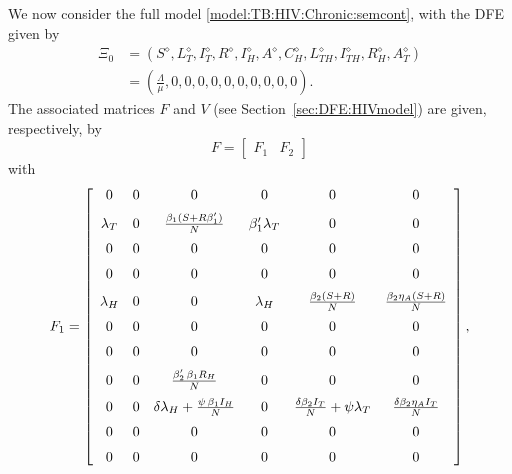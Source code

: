\documentclass{my_aims}
\theoremstyle{definition}
\begin{document}
We now consider the full model \eqref{model:TB:HIV:Chronic:semcont},
with the DFE given by
\begin{equation*}
\begin{split}
\Xi_0 &= \left( S^\diamond, L_T^\diamond, I_T^\diamond, R^\diamond, I_H^\diamond, A^\diamond,
C_H^\diamond, L_{TH}^\diamond, I_{TH}^\diamond, R_H^\diamond, A_T^\diamond \right)\\
&= \left( \frac{\Lambda}{\mu}, 0, 0, 0, 0, 0, 0, 0, 0, 0, 0 \right).
\end{split}
\end{equation*}
The associated matrices $F$ and $V$ (see Section~\ref{sec:DFE:HIVmodel})
are given, respectively, by
\begin{equation*}
F = \left[ \begin {array}{cc}
F_1 & F_2
\end {array} \right]
\end{equation*}
with
\begin{equation*}
F_1 = \left[ \begin {array}{cccccc}
0&0&0&0&0&0\\ \noalign{\medskip}
\lambda_T &0&{\frac{\beta_1(S + R \beta'_1)}{N}} & \beta'_1 \lambda_T &0&0\\
\noalign{\medskip} 0&0&0&0&0&0\\
\noalign{\medskip}0&0&0&0&0&0\\ \noalign{\medskip}
\lambda_H &0&0&\lambda_H&{\frac{\beta_2(S + R)}{N}}
&{\frac{\beta_2 \eta_A(S + R)}{N}} \\
\noalign{\medskip} 0&0&0&0&0&0\\
\noalign{\medskip} 0&0&0&0&0&0\\
\noalign{\medskip} 0&0&{\frac {\beta'_2 \,\beta_1 R_H}{N}} &0&0&0\\
\noalign{\medskip} 0&0&\delta \lambda_H
+{\frac{\psi\,\beta_1 I_H}{N}}&0&
{\frac{\delta \beta_2 I_T}{N}} +\psi \lambda_T
&{\frac {\delta \beta_2 \eta_A I_T}{N}}\\
\noalign{\medskip} 0&0&0&0&0&0\\
\noalign{\medskip} 0&0&0&0&0&0
\end{array} \right],
\end{equation*}
\end{document}
